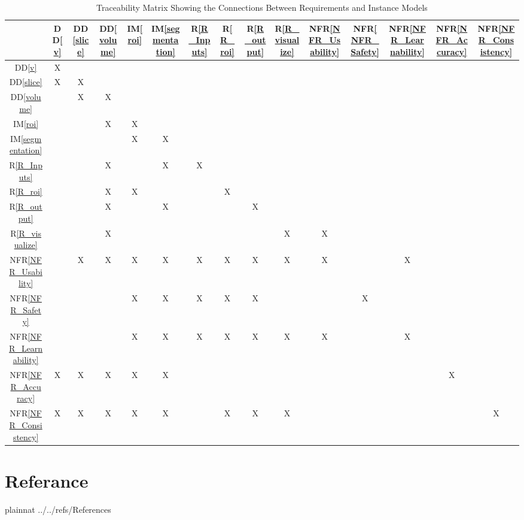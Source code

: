 \documentclass[12pt]{article}
\newcommand{\ddref}[1]{DD\ref{#1}}
\newcommand{\iref}[1]{IM\ref{#1}}
\newcommand{\rref}[1]{R\ref{#1}}
\newcommand{\nfrref}[1]{NFR\ref{#1}}
\begin{document}
\begin{table}
\centering

\begin{tabular}{|c|c|c|c|c|c|c|c|c|c|c|c|c|c|c|}
\hline
	& \ddref{v} & \ddref{slice} & \ddref{volume} & \iref{roi}& \iref{segmentation}& \rref{R_Inputs}& \rref{R_roi}& \rref{R_output} & \rref{R_visualize} & \nfrref{NFR_Usability} & \nfrref{NFR_Safety} & \nfrref{NFR_Learnability} & \nfrref{NFR_Accuracy} & \nfrref{NFR_Consistency} \\
\hline
\ddref{v}           & X & & & & & & & & &  & & & & \\ \hline
\ddref{slice}           & X & X & & & & &  & & &  & & & & \\ \hline
\ddref{volume}           & & X & X & & & & & & &  & & & & \\ \hline
\iref{roi}           & & & X & X & & & & & &  & & & & \\ \hline
\iref{segmentation}  & & & & X & X & & & & &  & & & &\\ \hline
\rref{R_Inputs}    & & & X & & X & X  &  & & & & & & &\\ \hline
\rref{R_roi}  & & & X& X & & & X & & & & & & &\\ \hline
\rref{R_output} & & & X & & X & & & X & & & & & &\\ \hline
\rref{R_visualize} & & & X& & & & & & X & X & & & &\\ \hline
\nfrref{NFR_Usability}  & & X & X & X & X & X & X & X & X & X & & X & &\\ \hline
\nfrref{NFR_Safety}  & & & & X & X & X & X & X &  & & X & & &\\ \hline
\nfrref{NFR_Learnability} & & & & X & X & X & X & X & X & X & & X & & \\ \hline
\nfrref{NFR_Accuracy} & X & X & X & X & X & & & & & & & & X &\\ \hline
\nfrref{NFR_Consistency} & X & X & X & X & X &  & X & X & X & & & & &X\\ \hline
\end{tabular}
\caption{Traceability Matrix Showing the Connections Between Requirements and Instance Models}
\label{Table:R_trace}
\end{table}

\newpage

\section{Referance}
 {plainnat}
 {../../refs/References}
\end{document}
